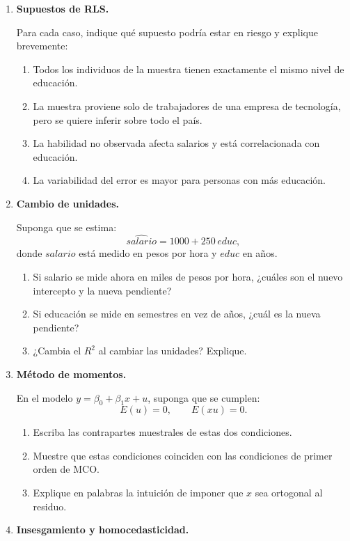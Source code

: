 \documentclass[11pt]{article}
\begin{document}
\begin{enumerate}[label=\textbf{Ejercicio \arabic*.}, leftmargin=*]
    \item \textbf{Supuestos de RLS.}
    
    Para cada caso, indique qué supuesto podría estar en riesgo y explique brevemente:
    \begin{enumerate}[label=\alph*)]
        \item Todos los individuos de la muestra tienen exactamente el mismo nivel de educación.
        \item La muestra proviene solo de trabajadores de una empresa de tecnología, pero se quiere inferir sobre todo el país.
        \item La habilidad no observada afecta salarios y está correlacionada con educación.
        \item La variabilidad del error es mayor para personas con más educación.
    \end{enumerate}

    \item \textbf{Cambio de unidades.}
    
    Suponga que se estima:
    \[
        \widehat{salario}=1000+250\,educ,
    \]
    donde $salario$ está medido en pesos por hora y $educ$ en años.
    \begin{enumerate}[label=\alph*)]
        \item Si salario se mide ahora en miles de pesos por hora, ¿cuáles son el nuevo intercepto y la nueva pendiente?
        \item Si educación se mide en semestres en vez de años, ¿cuál es la nueva pendiente?
        \item ¿Cambia el $R^2$ al cambiar las unidades? Explique.
    \end{enumerate}

    \item \textbf{Método de momentos.}
    
    En el modelo $y=\beta_0+\beta_1x+u$, suponga que se cumplen:
    \[
        E(u)=0,\qquad E(xu)=0.
    \]
    \begin{enumerate}[label=\alph*)]
        \item Escriba las contrapartes muestrales de estas dos condiciones.
        \item Muestre que estas condiciones coinciden con las condiciones de primer orden de MCO.
        \item Explique en palabras la intuición de imponer que $x$ sea ortogonal al residuo.
    \end{enumerate}

    \item \textbf{Insesgamiento y homocedasticidad.}
    

\end{enumerate}
\end{document}
